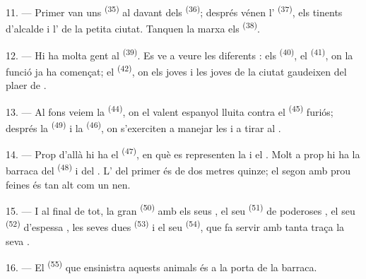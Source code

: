 11. --- Primer van uns  \textsuperscript{(35)} al davant dels
 \textsuperscript{(36)}; després vénen l'
\textsuperscript{(37)}, els tinents d'alcalde i l' de la petita ciutat.
Tanquen la marxa els  \textsuperscript{(38)}.

\VUsaut{5.0mm}
\VUsaut{3.6mm}

12. --- Hi ha molta gent al  \textsuperscript{(39)}. Es ve a veure les
diferents : els  \textsuperscript{(40)}, el
 \textsuperscript{(41)}, on la funció ja ha començat; el 
\textsuperscript{(42)}, on els joves i les joves de la ciutat gaudeixen del plaer de
.

13. --- Al fons veiem la  \textsuperscript{(44)}, on el valent
 espanyol lluita contra el  \textsuperscript{(45)} furiós;
després la  \textsuperscript{(49)} i la 
\textsuperscript{(46)}, on s'exerciten a manejar les  i a tirar al
.

14. --- Prop d'allà hi ha el  \textsuperscript{(47)}, en què es
representen la  i el . Molt a prop hi ha la barraca del
 \textsuperscript{(48)} i del . L' del primer és
de dos metres quinze; el segon amb prou feines és tan alt com un nen.

15. --- I al final de tot, la gran  \textsuperscript{(50)} amb els
seus , el seu
 \textsuperscript{(51)} de poderoses , el seu
 \textsuperscript{(52)} d'espessa , les seves dues
 \textsuperscript{(53)} i el seu 
\textsuperscript{(54)}, que fa servir amb tanta traça la seva .

16. --- El  \textsuperscript{(55)} que ensinistra aquests animals és a la
porta de la barraca.
\VUsaut{6.0mm}
\VUfilet{22mm}
